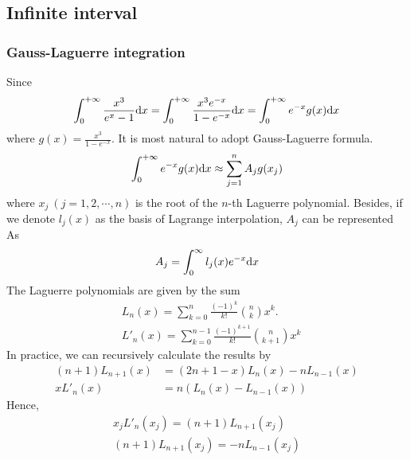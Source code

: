 \documentclass[conference,onecolumn,12pt]{IEEEtran}
\theoremstyle{definition}
\begin{document}
\subsection{Infinite interval}
\subsubsection{Gauss-Laguerre integration}
Since 
\begin{equation}
    \int_0^{+\infty} \frac{x^3}{e^x-1} {\rm d} x =     \int_0^{+\infty} \frac{x^3 e^{-x}}{1-e^{-x}} {\rm d} x =  \int_0^{+\infty} e^{-x} g(x) {\rm d} x
\end{equation}
where $g(x) = \frac{x^3}{1-e^{-x}}$. It is most natural to adopt Gauss-Laguerre formula.
\begin{equation}
    \int_0^{+\infty} e^{-x} g(x) {\rm d} x \approx \sum_{j=1}^n A_j g(x_j)
\end{equation}
where $x_j\ (j=1,2,\cdots,n)$ is the root of the $n$-th Laguerre polynomial. Besides, if we denote $l_j(x)$ as the basis of Lagrange interpolation, $A_j$ can be represented As
\begin{equation}
    A_j = \int_0^{\infty} l_j(x) e^{-x} {\rm d} x
\end{equation}
The Laguerre polynomials are given by the sum
\begin{subequations}
    \begin{align}
        &L_n(x) = \sum_{k=0}^n \frac{(-1)^k}{k!}\binom{n}{k} x^k.\\
        &L'_n(x) = \sum_{k=0}^{n-1} \frac{(-1)^{k+1}}{k!}\binom{n}{k+1} x^k
    \end{align}
\end{subequations}
In practice, we can recursively calculate the results by
\begin{equation}
    \begin{split}
        (n+1)L_{n+1}(x) &= (2n+1-x)L_n(x)-nL_{n-1}(x)\\
        xL'_n(x)&=n(L_n(x)-L_{n-1}(x))
    \end{split}
\end{equation}
Hence, 
\begin{equation}
    \label{2rela}
    \begin{split}
        x_jL'_n(x_j) = (n+1)L_{n+1}(x_j)\\
        (n+1) L_{n+1}(x_j) = -nL_{n-1}(x_j)\\     
    \end{split}
\end{equation}
\end{document}
